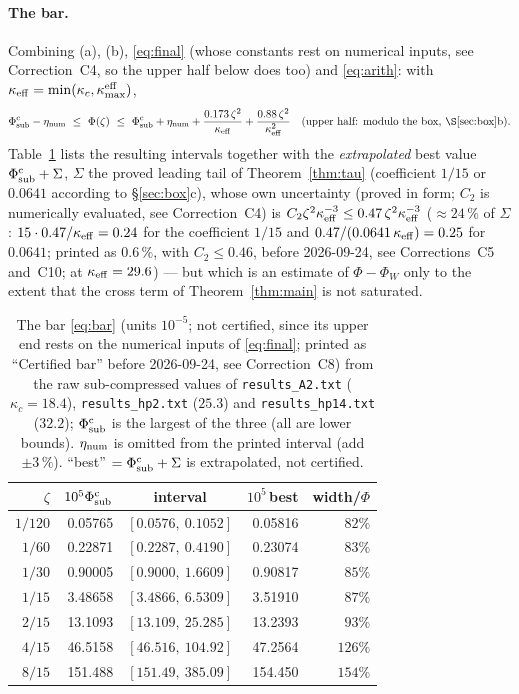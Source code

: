 \documentclass[11pt]{article}
\begin{document}
\paragraph{The bar.}  Combining (a), (b), \eqref{eq:final} (whose constants rest on numerical inputs, see Correction~C4, so the upper half below does too) and \eqref{eq:arith}: with
$\kappa_{\rm eff}=\min(\kappa_c,\kappa_{\max}^{\rm eff})$,
\begin{equation}\label{eq:bar}
 \Phi^{\rm c}_{\rm sub}-\eta_{\rm num}\ \le\ \Phi(\zeta)\ \le\
 \Phi^{\rm c}_{\rm sub}+\eta_{\rm num}+\frac{0.173\,\zeta^2}{\kappa_{\rm eff}}
 +\frac{0.88\,\zeta^2}{\kappa_{\rm eff}^2}\quad(\text{upper half: modulo the box, \S\ref{sec:box}b}).
\end{equation}
Table~\ref{tab:bars} lists the resulting intervals together with the \emph{extrapolated} best value
$\Phi^{\rm c}_{\rm sub}+\Sigma$, $\Sigma$ the proved leading tail of Theorem~\ref{thm:tau}
(coefficient $1/15$ or $0.0641$ according to \S\ref{sec:box}c), whose own uncertainty (proved in form; $C_2$ is numerically evaluated, see Correction~C4) is
$C_2\zeta^2\kappa_{\rm eff}^{-3}\le0.47\,\zeta^2\kappa_{\rm eff}^{-3}$ ($\approx24\,\%$ of $\Sigma$: $15\cdot0.47/\kappa_{\rm eff}=0.24$ for the coefficient $1/15$ and $0.47/(0.0641\,\kappa_{\rm eff})=0.25$ for $0.0641$; printed as $0.6\,\%$, with $C_2\le0.46$, before 2026-09-24, see Corrections~C5 and~C10; at
$\kappa_{\rm eff}=29.6$) --- but which is an estimate of $\Phi-\Phi_W$ only to the extent that the
cross term of Theorem~\ref{thm:main} is not saturated.

\begin{table}[ht]\centering\small
\caption{The bar \eqref{eq:bar} (units $10^{-5}$; not certified, since its upper end rests on the numerical inputs of \eqref{eq:final}; printed as ``Certified bar'' before 2026-09-24, see Correction~C8) from the raw sub-compressed values of
\texttt{results\_A2.txt} ($\kappa_c=18.4$), \texttt{results\_hp2.txt} ($25.3$) and
\texttt{results\_hp14.txt} ($32.2$); $\Phi^{\rm c}_{\rm sub}$ is the largest of the three (all are
lower bounds).  $\eta_{\rm num}$ is omitted from the printed interval (add $\pm3\,\%$).
``best'' $=\Phi^{\rm c}_{\rm sub}+\Sigma$ is extrapolated, not certified.}\label{tab:bars}
\begin{tabular}{r r c r r}\toprule
$\zeta$ & $10^5\Phi^{\rm c}_{\rm sub}$ & interval & $10^5\,$best & width/$\Phi$\\\midrule
$1/120$ & 0.05765 & $[0.0576,\ 0.1052]$ & 0.05816 & $82\%$\\
$1/60$  & 0.22871 & $[0.2287,\ 0.4190]$ & 0.23074 & $83\%$\\
$1/30$  & 0.90005 & $[0.9000,\ 1.6609]$ & 0.90817 & $85\%$\\
$1/15$  & 3.48658 & $[3.4866,\ 6.5309]$ & 3.51910 & $87\%$\\
$2/15$  & 13.1093 & $[13.109,\ 25.285]$ & 13.2393 & $93\%$\\
$4/15$  & 46.5158 & $[46.516,\ 104.92]$ & 47.2564 & $126\%$\\
$8/15$  & 151.488 & $[151.49,\ 385.09]$ & 154.450 & $154\%$\\
\bottomrule\end{tabular}\end{table}
\end{document}
